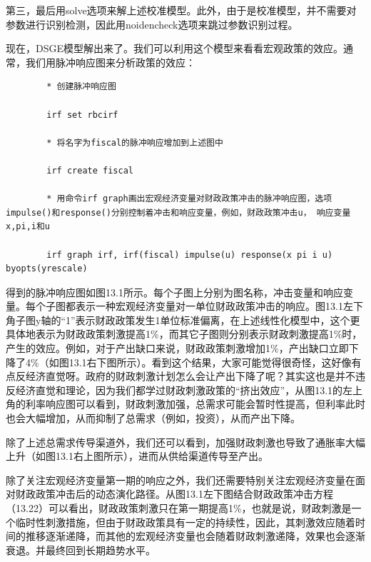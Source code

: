 \documentclass[cn,12pt,math=newtx,citestyle=gb7714-2015,bibstyle=gb7714-2015]{elegantbook}
\begin{document}
第三，最后用solve选项来解上述校准模型。此外，由于是校准模型，并不需要对参数进行识别检测，因此用noidencheck选项来跳过参数识别过程。

    现在，DSGE模型解出来了。我们可以利用这个模型来看看宏观政策的效应。通常，我们用脉冲响应图来分析政策的效应：
    
    \begin{lstlisting}
    	* 创建脉冲响应图
    	
    	irf set rbcirf
    	
    	* 将名字为fiscal的脉冲响应增加到上述图中
    	
    	irf create fiscal
    	
    	* 用命令irf graph画出宏观经济变量对财政政策冲击的脉冲响应图，选项impulse()和response()分别控制着冲击和响应变量，例如，财政政策冲击u， 响应变量x,pi,i和u
    	
    	irf graph irf, irf(fiscal) impulse(u) response(x pi i u) byopts(yrescale)

    \end{lstlisting}

    得到的脉冲响应图如图13.1所示。每个子图上分别为图名称，冲击变量和响应变量。每个子图都表示一种宏观经济变量对一单位财政政策冲击的响应。图13.1左下角子图y轴的“1”表示财政政策发生1单位标准偏离，在上述线性化模型中，这个更具体地表示为财政政策刺激提高1\%，而其它子图则分别表示财政刺激提高1\%时，产生的效应。例如，对于产出缺口来说，财政政策刺激增加1\%，产出缺口立即下降了4\%（如图13.1右下图所示）。看到这个结果，大家可能觉得很奇怪，这好像有点反经济直觉呀。政府的财政刺激计划怎么会让产出下降了呢？其实这也是并不违反经济直觉和理论，因为我们都学过财政刺激政策的“挤出效应”，从图13.1的左上角的利率响应图可以看到，财政刺激加强，总需求可能会暂时性提高，但利率此时也会大幅增加，从而抑制了总需求（例如，投资），从而产出下降。
    
    除了上述总需求传导渠道外，我们还可以看到，加强财政刺激也导致了通胀率大幅上升（如图13.1右上图所示），进而从供给渠道传导至产出。
    
    除了关注宏观经济变量第一期的响应之外，我们还需要特别关注宏观经济变量在面对财政政策冲击后的动态演化路径。从图13.1左下图结合财政政策冲击方程（13.22）可以看出，财政政策刺激只在第一期提高1\%，也就是说，财政刺激是一个临时性刺激措施，但由于财政政策具有一定的持续性，因此，其刺激效应随着时间的推移逐渐递降，而其他的宏观经济变量也会随着财政刺激递降，效果也会逐渐衰退。并最终回到长期趋势水平。
    
\end{document}
